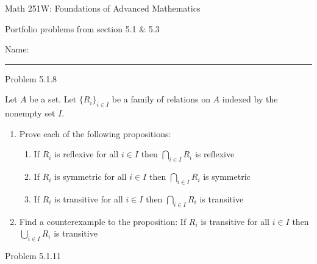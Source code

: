 \documentclass{article}
\theoremstyle{definition}
\begin{document}
	\begin{center}
		\Large{Math 251W: Foundations of Advanced Mathematics}

		\normalsize  Portfolio problems from section 5.1 \& 5.3

		\hfill Name:

		\vspace{0.4cm}
		\hrule \vspace{0.4cm}


		\vspace{0.75cm}
	\end{center}



	\noindent Problem 5.1.8  \vspace{0.3cm}

	Let $A$ be a set. Let $\{R_i\}_{i\in I}$ be a family of relations
	on $A$ indexed by the nonempty set $I$.

	\begin{enumerate}
		\item[a] Prove each of the following propositions:
		\begin{enumerate}
			\item[i] If $R_i$ is reflexive for all $i\in I$ then
			$\bigcap_{i\in I} R_i$ is reflexive
			\item[ii] If $R_i$ is symmetric for all $i\in I$ then
			$\bigcap_{i\in I} R_i$ is symmetric
			\item[iii] If $R_i$ is transitive for all $i\in I$ then
			$\bigcap_{i\in I} R_i$ is transitive
		\end{enumerate}

		\vspace{.2cm}



		\vspace{.2cm}

		\item[b] Find a counterexample to the proposition:
		If $R_i$ is transitive for all $i\in I$ then
		$\bigcup_{i\in I} R_i$ is transitive


		\vspace{.2cm}


	\end{enumerate}
	\vspace{1cm}



	\noindent Problem 5.1.11  \vspace{0.3cm}
\end{document}
